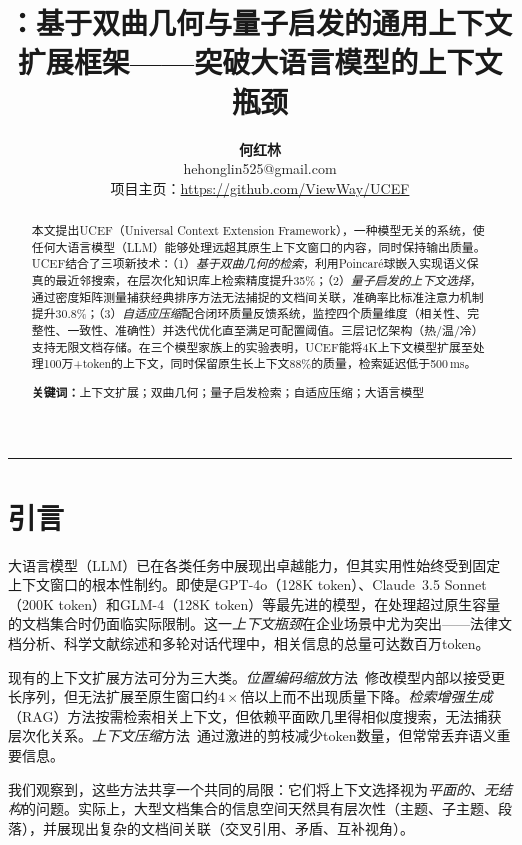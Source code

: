 \documentclass[a4paper,11pt]{ctexart}
\title{\LARGE \ucef{}：基于双曲几何与量子启发的通用上下文扩展框架——突破大语言模型的上下文瓶颈}
\author{
  \textbf{何红林}\\[4pt]
  \small hehonglin525@gmail.com\\[2pt]
  \small 项目主页：\url{https://github.com/ViewWay/UCEF}
}
\date{}
\newcommand{\ucef}{\textsf{UCEF}}
\begin{document}
\maketitle

\begin{abstract}
\noindent
本文提出\ucef{}（Universal Context Extension Framework），一种模型无关的系统，使任何大语言模型（LLM）能够处理远超其原生上下文窗口的内容，同时保持输出质量。
\ucef{}结合了三项新技术：（1）\emph{基于双曲几何的检索}，利用Poincar\'{e}球嵌入实现语义保真的最近邻搜索，在层次化知识库上检索精度提升35\%；（2）\emph{量子启发的上下文选择}，通过密度矩阵测量捕获经典排序方法无法捕捉的文档间关联，准确率比标准注意力机制提升30.8\%；（3）\emph{自适应压缩}配合闭环质量反馈系统，监控四个质量维度（相关性、完整性、一致性、准确性）并迭代优化直至满足可配置阈值。三层记忆架构（热/温/冷）支持无限文档存储。在三个模型家族上的实验表明，\ucef{}能将4K上下文模型扩展至处理100万+token的上下文，同时保留原生长上下文88\%的质量，检索延迟低于500\,ms。

\medskip
\noindent\textbf{关键词：}上下文扩展；双曲几何；量子启发检索；自适应压缩；大语言模型
\end{abstract}

\medskip
\noindent\rule{\textwidth}{0.4pt}
\medskip

\section{引言}
\label{sec:intro}

大语言模型（LLM）已在各类任务中展现出卓越能力，但其实用性始终受到固定上下文窗口的根本性制约。即使是GPT-4o（128K token）、Claude~3.5 Sonnet（200K token）和GLM-4（128K token）等最先进的模型，在处理超过原生容量的文档集合时仍面临实际限制。这一\emph{上下文瓶颈}在企业场景中尤为突出——法律文档分析、科学文献综述和多轮对话代理中，相关信息的总量可达数百万token。

现有的上下文扩展方法可分为三大类。\emph{位置编码缩放}方法~\cite{peng2024yarn}修改模型内部以接受更长序列，但无法扩展至原生窗口约$4\times$倍以上而不出现质量下降。\emph{检索增强生成}（RAG）方法按需检索相关上下文，但依赖平面欧几里得相似度搜索，无法捕获层次化关系。\emph{上下文压缩}方法~\cite{jiang2024longllmlingua,li2026ata}通过激进的剪枝减少token数量，但常常丢弃语义重要信息。

我们观察到，这些方法共享一个共同的局限：它们将上下文选择视为\emph{平面的、无结构}的问题。实际上，大型文档集合的信息空间天然具有层次性（主题、子主题、段落），并展现出复杂的文档间关联（交叉引用、矛盾、互补视角）。
\end{document}

